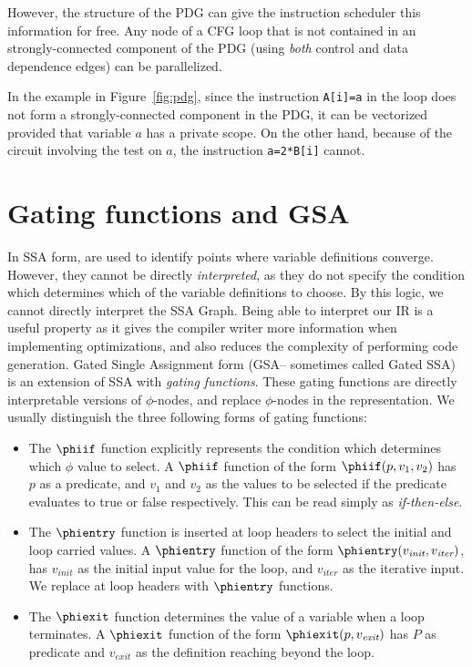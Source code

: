 However, the structure of the PDG can give the instruction scheduler this information for free. Any node of a CFG loop that is not contained in an strongly-connected component of the PDG (using \textit{both} control and data dependence edges) can be parallelized. 

In the example in Figure~\ref{fig:pdg}, since the instruction \texttt{A[i]=a} in the loop does not form a strongly-connected component in the PDG, it can be vectorized provided that variable $a$ has a private scope. 
On the other hand, because of the circuit involving the test on $a$, the instruction \texttt{a=2*B[i]} cannot.


\section{Gating functions and GSA}
\label{sec:gating_functions}
In SSA form, \phifuns are used to identify points where variable definitions converge. 
However, they cannot be directly \textit{interpreted}, as they do not specify the condition which determines which of the variable definitions to choose. 
By this logic, we cannot directly interpret the SSA Graph. 
Being able to interpret our IR is a useful property as it gives the compiler writer more information when implementing optimizations, and also reduces the complexity of performing code generation. 
Gated Single Assignment form (GSA-- sometimes called Gated SSA) is an extension of SSA with \textit{gating functions}. 
These gating functions are directly interpretable versions of $\phi$-nodes, and replace $\phi$-nodes in the representation. 
We usually distinguish the three following forms of gating functions:

\begin{itemize}
\item The $\phiif$ function explicitly represents the condition which determines which $\phi$ value to select. 
  A $\phiif$ function of the form $\phiif(p,v_{1},v_{2})$ has $p$ as a predicate, and $v_{1}$ and $v_{2}$ as the values to be selected if the predicate evaluates to true or false respectively. 
  This can be read simply as \textit{if-then-else}.
\item The $\phientry$ function is inserted at loop headers to select the initial and loop carried values. A $\phientry$ function of the form $\phientry(v_\textit{init},v_\textit{iter})$, has $v_\textit{init}$ as the initial input value for the loop, and $v_\textit{iter}$ as the iterative input. We replace \phifuns at loop headers with $\phientry$ functions.
\item The $\phiexit$ function determines the value of a variable when a loop terminates. 
  A $\phiexit$ function of the form $\phiexit(p,v_\textit{exit})$ has $P$ as predicate and $v_\textit{exit}$ as the definition reaching beyond the loop.
\end{itemize}

